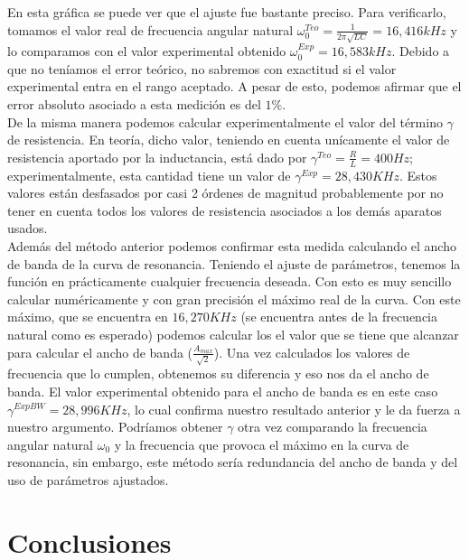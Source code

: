 \documentclass[%
 reprint,
 amsmath,amssymb,
 aps,
]{revtex4-1}
\begin{document}
En esta gráfica se puede ver que el ajuste fue bastante preciso. Para verificarlo, tomamos el valor real de frecuencia angular natural $\omega_0^{Teo} = \frac{1}{2\pi \sqrt{LC}} = 16,416kHz$ y lo comparamos con el valor experimental obtenido  $\omega_0^{Exp} = 16,583kHz$. Debido a que no teníamos el error teórico, no sabremos con exactitud si el valor experimental entra en el rango aceptado. A pesar de esto, podemos afirmar que el error absoluto asociado a esta medición es del $1\%$.\\

De la misma manera podemos calcular experimentalmente el valor del t\'ermino $\gamma$ de resistencia. En teoría, dicho valor, teniendo en cuenta un\'icamente el valor de resistencia aportado por la inductancia, est\'a dado por $\gamma^{Teo} = \frac{R}{L} = 400Hz$; experimentalmente, esta cantidad tiene un valor de $\gamma^{Exp} = 28,430KHz$. Estos valores están desfasados por casi 2 \'ordenes de magnitud probablemente por no tener en cuenta todos los valores de resistencia asociados a los dem\'as aparatos usados.\\

Adem\'as del m\'etodo anterior podemos confirmar esta medida calculando el ancho de banda de la curva de resonancia. Teniendo el ajuste de par\'ametros, tenemos la funci\'on en pr\'acticamente cualquier frecuencia deseada. Con esto es muy sencillo calcular num\'ericamente y con gran precisi\'on el m\'aximo real de la curva. Con este m\'aximo, que se encuentra en $16,270KHz$ (se encuentra antes de la frecuencia natural como es esperado) podemos calcular los el valor que se tiene que alcanzar para calcular el ancho de banda ($\frac{A_{max}}{\sqrt{2}}$). Una vez calculados los valores de frecuencia que lo cumplen, obtenemos su diferencia y eso nos da el ancho de banda. El valor experimental obtenido para el ancho de banda es en este caso $\gamma^{ExpBW} = 28,996KHz$, lo cual confirma nuestro resultado anterior y le da fuerza a nuestro argumento. Podr\'iamos obtener $\gamma$ otra vez comparando la frecuencia angular natural $\omega_0$ y la frecuencia que provoca el m\'aximo en la curva de resonancia, sin embargo, este m\'etodo ser\'ia redundancia del ancho de banda y del uso de par\'ametros ajustados.\\
 


 


\section{\label{sec:level1}Conclusiones}
\end{document}
